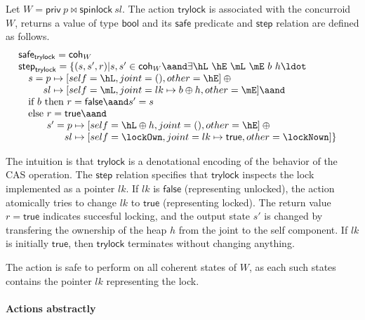 Let $W = \mathsf{priv}\ p \bowtie \mathsf{spinlock}\ sl$. The action
$\mathsf{trylock}$ is associated with the concurroid $W$, returns a
value of type $\mathsf{bool}$ and its $\mathsf{safe}$ predicate and
$\mathsf{step}$ relation are defined as follows.
\[
\begin{array}{l}
\mathsf{safe}_{\mathsf{trylock}} = \mathsf{coh}_W\\
\mathsf{step}_{\mathsf{trylock}} = 
  \{(s, s', r) | s, s' \in \mathsf{coh}_W \aand \exists \hL\ \hE\ \mL\ \mE\ b\ h\ldot\hbox{}\\
\quad \!\!\!\begin{array}[t]{l}
    s = p \mapsto [self=\hL,joint=(),other=\hE] \oplus \hbox{}\\
    \hphantom{s =} sl \mapsto [self=\mL, joint=lk \mapsto b \oplus h, other=\mE] \aand \hbox{}\\
    \mbox{if}\ b\ \mbox{then}\ r = \mathsf{false} \aand s' = s\\
   \mbox{else}\ \!\!\!\begin{array}[t]{l}
                 r = \mathsf{true} \aand \hbox{}\\
                 s' = p \mapsto [self=\hL \oplus h, joint=(), other=\hE] \oplus \hbox{}\\
                 \hphantom{s' =} sl \mapsto [self=\lockOwn, joint=lk \mapsto \mathsf{true}, other=\lockNown]\}
               \end{array}
    \end{array}
\end{array}
\]

The intuition is that $\mathsf{trylock}$ is a denotational encoding of
the behavior of the CAS operation. The $\mathsf{step}$ relation
specifies that $\mathsf{trylock}$ inspects the lock implemented as a
pointer $lk$. If $lk$ is $\mathsf{false}$ (representing unlocked), the
action atomically tries to change $lk$ to $\mathsf{true}$
(representing locked). The return value $r = \mathsf{true}$ indicates
succesful locking, and the output state $s'$ is changed by transfering
the ownership of the heap $h$ from the joint to the self component. If
$lk$ is initially $\mathsf{true}$, then $\mathsf{trylock}$ terminates
without changing anything.

The action is safe to perform on all coherent states of $W$, as each
such states contains the pointer $lk$ representing the lock.


\paragraph{Actions abstractly}

